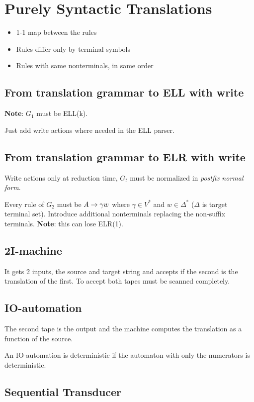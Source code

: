 \section{Purely Syntactic Translations}

\begin{itemize}
    \item 1-1 map between the rules
    \item Rules differ only by terminal symbols
    \item Rules with same nonterminals, in same order
\end{itemize}

\subsection{From translation grammar to ELL with write}
\textbf{Note}: $G_1$ must be ELL(k).

Just add write actions where needed in the ELL parser.

\subsection{From translation grammar to ELR with write}
Write actions only at reduction time, $G_t$ must be normalized in \emph{postfix normal form}.

Every rule of $G_2$ must be $A \rightarrow \gamma w$ where $\gamma\in V^*$ and $w \in \Delta^*$ ($\Delta$ is target terminal set). Introduce additional nonterminals replacing the non-suffix terminals. \textbf{Note}: this can lose ELR(1).

\subsection{2I-machine}

It gets 2 inputs, the source and target string and accepts if the second is the translation of the first. To accept both tapes must be scanned completely.

\subsection{IO-automation}

The second tape is the output and the machine computes the translation as a function of the source.

An IO-automation is deterministic if the automaton with only the numerators is deterministic.

\subsection{Sequential Transducer}

